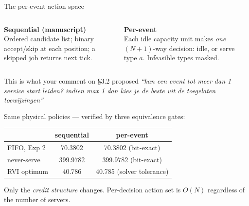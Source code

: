 \documentclass[11pt,aspectratio=169]{beamer}
\begin{document}
\begin{frame}{The per-event action space}

\begin{columns}[T]
\textbf{Sequential (manuscript)} \\[2pt]
Ordered candidate list; binary accept/skip at each position; a skipped job
returns next tick.

\textbf{Per-event} \\[2pt]
Each idle capacity unit makes \emph{one} $(N{+}1)$-way decision: idle, or serve
type $a$.  Infeasible types masked.
\end{columns}

\vfill
\begin{block}{This is what your comment on \S3.2 proposed}
\emph{``kan een event tot meer dan 1 service start leiden? indien max 1 dan kies
je de beste uit de toegelaten toewijzingen''}
\end{block}

\vfill
Same physical policies --- verified by three equivalence gates:

\begin{center}
\small
\begin{tabular}{lcc}
\toprule
 & sequential & per-event \\
\midrule
FIFO, Exp 2         & 70.3802  & 70.3802 \quad(bit-exact) \\
never-serve         & 399.9782 & 399.9782 \quad(bit-exact) \\
RVI optimum         & 40.786   & 40.785 \quad(solver tolerance) \\
\bottomrule
\end{tabular}
\end{center}

\vfill
\small Only the \emph{credit structure} changes.  Per-decision action set is
$O(N)$ regardless of the number of servers.

\end{frame}
\end{document}
